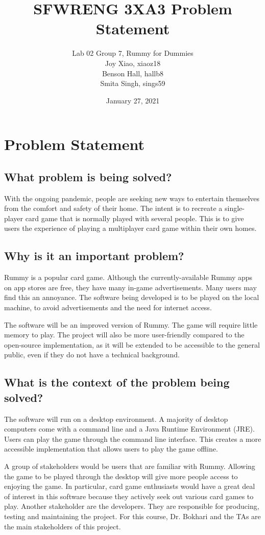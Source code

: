 \documentclass[12pt]{article}
\title{SFWRENG 3XA3 Problem Statement}
\author{
	Lab 02 Group 7, Rummy for Dummies
		\\ Joy Xiao, xiaoz18
        \\ Benson Hall, hallb8
        \\ Smita Singh, sings59
}
\date{January 27, 2021}
\begin{document}
\maketitle

\section{Problem Statement}
\subsection*{What problem is being solved?}
With the ongoing pandemic, people are seeking new ways to entertain themselves from the comfort and safety of their home. The intent is to recreate a single-player card game that is normally played with several people. This is to give users the experience of playing a multiplayer card game within their own homes.

\subsection*{Why is it an important problem?}
Rummy is a popular card game. Although the currently-available Rummy apps on app stores are free, they have many in-game advertisements. Many users may find this an annoyance. The software being developed is to be played on the local machine, to avoid advertisements and the need for internet access.

The software will be an improved version of Rummy. The game will require little memory to play. The project will also be more user-friendly compared to the open-source implementation, as it will be extended to be accessible to the general public, even if they do not have a technical background.

\subsection*{What is the context of the problem being solved?}
The software will run on a desktop environment. A majority of desktop computers come with a command line and a Java Runtime Environment (JRE). Users can play the game through the command line interface. This creates a more accessible implementation that allows users to play the game offline.

A group of stakeholders would be users that are familiar with Rummy. Allowing the game to be played through the desktop will give more people access to enjoying the game. In particular, card game enthusiasts would have a great deal of interest in this software because they actively seek out various card games to play. Another stakeholder are the developers. They are responsible for producing, testing and maintaining the project. For this course, Dr. Bokhari and the TAs are the main stakeholders of this project.
\end{document}
